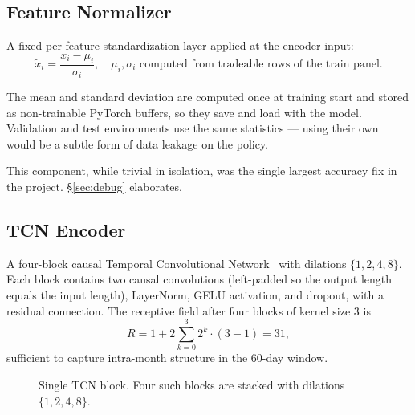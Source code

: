 \documentclass[11pt,a4paper]{article}
\begin{document}
\subsection{Feature Normalizer}

A fixed per-feature standardization layer applied at the encoder input:
\[ \tilde{x}_i = \frac{x_i - \mu_i}{\sigma_i},\quad
   \mu_i, \sigma_i \text{ computed from tradeable rows of the train panel.} \]

The mean and standard deviation are computed once at training start and stored as
non-trainable PyTorch buffers, so they save and load with the model. Validation
and test environments use the same statistics --- using their own would be a subtle
form of data leakage on the policy.

This component, while trivial in isolation, was the single largest accuracy fix
in the project. \S\ref{sec:debug} elaborates.

\subsection{TCN Encoder}

A four-block causal Temporal Convolutional Network~\cite{bai2018tcn} with
dilations $\{1, 2, 4, 8\}$. Each block contains two causal convolutions
(left-padded so the output length equals the input length), LayerNorm, GELU
activation, and dropout, with a residual connection. The receptive field after
four blocks of kernel size 3 is
\[ R = 1 + 2 \sum_{k=0}^{3} 2^k \cdot (3 - 1) = 31, \]
sufficient to capture intra-month structure in the 60-day window.

\begin{figure}[h]
\centering
{}
\caption{Single TCN block. Four such blocks are stacked with dilations $\{1, 2, 4, 8\}$.}
\label{fig:tcn-block}
\end{figure}
\end{document}
